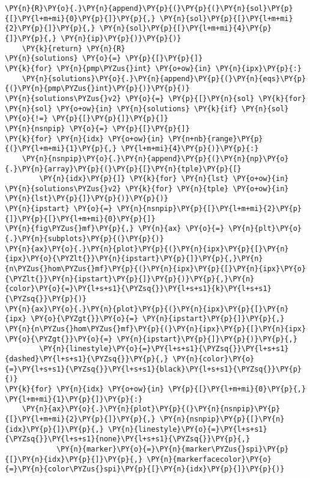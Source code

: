 \begin{Verbatim}[commandchars=\\\{\}]
                \PY{n}{R}\PY{o}{.}\PY{n}{append}\PY{p}{(}\PY{p}{(}\PY{n}{sol}\PY{p}{[}\PY{l+m+mi}{0}\PY{p}{]}\PY{p}{,} \PY{n}{sol}\PY{p}{[}\PY{l+m+mi}{2}\PY{p}{]}\PY{p}{,} \PY{n}{sol}\PY{p}{[}\PY{l+m+mi}{4}\PY{p}{]}\PY{p}{,} \PY{n}{ip}\PY{p}{)}\PY{p}{)}
    \PY{k}{return} \PY{n}{R}
\PY{n}{solutions} \PY{o}{=} \PY{p}{[}\PY{p}{]}
\PY{k}{for} \PY{n}{pmp\PYZus{}int} \PY{o+ow}{in} \PY{n}{ipx}\PY{p}{:}
    \PY{n}{solutions}\PY{o}{.}\PY{n}{append}\PY{p}{(}\PY{n}{eqs}\PY{p}{(}\PY{n}{pmp\PYZus{}int}\PY{p}{)}\PY{p}{)}
\PY{n}{solutions\PYZus{}v2} \PY{o}{=} \PY{p}{[}\PY{n}{sol} \PY{k}{for} \PY{n}{sol} \PY{o+ow}{in} \PY{n}{solutions} \PY{k}{if} \PY{n}{sol} \PY{o}{!=} \PY{p}{[}\PY{p}{]}\PY{p}{]}
\PY{n}{nsnpip} \PY{o}{=} \PY{p}{[}\PY{p}{]}
\PY{k}{for} \PY{n}{idx} \PY{o+ow}{in} \PY{n+nb}{range}\PY{p}{(}\PY{l+m+mi}{1}\PY{p}{,} \PY{l+m+mi}{4}\PY{p}{)}\PY{p}{:}
    \PY{n}{nsnpip}\PY{o}{.}\PY{n}{append}\PY{p}{(}\PY{n}{np}\PY{o}{.}\PY{n}{array}\PY{p}{(}\PY{p}{[}\PY{n}{tple}\PY{p}{[}
        \PY{n}{idx}\PY{p}{]} \PY{k}{for} \PY{n}{lst} \PY{o+ow}{in} \PY{n}{solutions\PYZus{}v2} \PY{k}{for} \PY{n}{tple} \PY{o+ow}{in} \PY{n}{lst}\PY{p}{]}\PY{p}{)}\PY{p}{)}
\PY{n}{ipstart} \PY{o}{=} \PY{n}{nsnpip}\PY{p}{[}\PY{l+m+mi}{2}\PY{p}{]}\PY{p}{[}\PY{l+m+mi}{0}\PY{p}{]}
\PY{n}{fig\PYZus{}mf}\PY{p}{,} \PY{n}{ax} \PY{o}{=} \PY{n}{plt}\PY{o}{.}\PY{n}{subplots}\PY{p}{(}\PY{p}{)}
\PY{n}{ax}\PY{o}{.}\PY{n}{plot}\PY{p}{(}\PY{n}{ipx}\PY{p}{[}\PY{n}{ipx}\PY{o}{\PYZlt{}}\PY{n}{ipstart}\PY{p}{]}\PY{p}{,}\PY{n}{n\PYZus{}hom\PYZus{}mf}\PY{p}{(}\PY{n}{ipx}\PY{p}{[}\PY{n}{ipx}\PY{o}{\PYZlt{}}\PY{n}{ipstart}\PY{p}{]}\PY{p}{)}\PY{p}{,}\PY{n}{color}\PY{o}{=}\PY{l+s+s1}{\PYZsq{}}\PY{l+s+s1}{k}\PY{l+s+s1}{\PYZsq{}}\PY{p}{)}
\PY{n}{ax}\PY{o}{.}\PY{n}{plot}\PY{p}{(}\PY{n}{ipx}\PY{p}{[}\PY{n}{ipx} \PY{o}{\PYZgt{}}\PY{o}{=} \PY{n}{ipstart}\PY{p}{]}\PY{p}{,} \PY{n}{n\PYZus{}hom\PYZus{}mf}\PY{p}{(}\PY{n}{ipx}\PY{p}{[}\PY{n}{ipx} \PY{o}{\PYZgt{}}\PY{o}{=} \PY{n}{ipstart}\PY{p}{]}\PY{p}{)}\PY{p}{,}
        \PY{n}{linestyle}\PY{o}{=}\PY{l+s+s1}{\PYZsq{}}\PY{l+s+s1}{dashed}\PY{l+s+s1}{\PYZsq{}}\PY{p}{,} \PY{n}{color}\PY{o}{=}\PY{l+s+s1}{\PYZsq{}}\PY{l+s+s1}{black}\PY{l+s+s1}{\PYZsq{}}\PY{p}{)}
\PY{k}{for} \PY{n}{idx} \PY{o+ow}{in} \PY{p}{[}\PY{l+m+mi}{0}\PY{p}{,} \PY{l+m+mi}{1}\PY{p}{]}\PY{p}{:}
    \PY{n}{ax}\PY{o}{.}\PY{n}{plot}\PY{p}{(}\PY{n}{nsnpip}\PY{p}{[}\PY{l+m+mi}{2}\PY{p}{]}\PY{p}{,} \PY{n}{nsnpip}\PY{p}{[}\PY{n}{idx}\PY{p}{]}\PY{p}{,} \PY{n}{linestyle}\PY{o}{=}\PY{l+s+s1}{\PYZsq{}}\PY{l+s+s1}{none}\PY{l+s+s1}{\PYZsq{}}\PY{p}{,}
            \PY{n}{marker}\PY{o}{=}\PY{n}{marker\PYZus{}spi}\PY{p}{[}\PY{n}{idx}\PY{p}{]}\PY{p}{,} \PY{n}{markerfacecolor}\PY{o}{=}\PY{n}{color\PYZus{}spi}\PY{p}{[}\PY{n}{idx}\PY{p}{]}\PY{p}{)}

\end{Verbatim}
